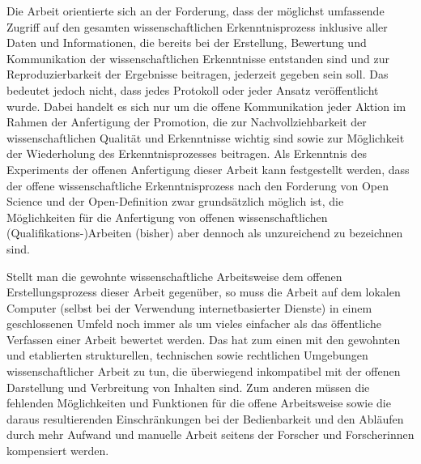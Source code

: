 Die Arbeit orientierte sich an der Forderung, dass der möglichst umfassende Zugriff auf den gesamten wissenschaftlichen Erkenntnisprozess inklusive aller Daten und Informationen, die bereits bei der Erstellung, Bewertung und Kommunikation der wissenschaftlichen Erkenntnisse entstanden sind und zur Reproduzierbarkeit der Ergebnisse beitragen, jederzeit gegeben sein soll. Das bedeutet jedoch nicht, dass jedes Protokoll oder jeder Ansatz veröffentlicht wurde. Dabei handelt es sich nur um die offene Kommunikation jeder Aktion im Rahmen der Anfertigung der Promotion, die zur Nachvollziehbarkeit der wissenschaftlichen Qualität und Erkenntnisse wichtig sind sowie zur Möglichkeit der Wiederholung des Erkenntnisprozesses beitragen. Als Erkenntnis des Experiments der offenen Anfertigung dieser Arbeit kann festgestellt werden, dass der offene wissenschaftliche Erkenntnisprozess nach den Forderung von Open Science und der Open-Definition zwar grundsätzlich möglich ist, die Möglichkeiten für die Anfertigung von offenen wissenschaftlichen (Qualifikations-)Arbeiten (bisher) aber dennoch als unzureichend zu bezeichnen sind.

Stellt man die gewohnte wissenschaftliche Arbeitsweise dem offenen Erstellungsprozess dieser Arbeit gegenüber, so muss die Arbeit auf dem lokalen Computer (selbst bei der Verwendung internetbasierter Dienste) in einem geschlossenen Umfeld noch immer als um vieles einfacher als das öffentliche Verfassen einer Arbeit bewertet werden. Das hat zum einen mit den gewohnten und etablierten strukturellen, technischen sowie rechtlichen Umgebungen wissenschaftlicher Arbeit zu tun, die überwiegend inkompatibel mit der offenen Darstellung und Verbreitung von Inhalten sind. Zum anderen müssen die fehlenden Möglichkeiten und Funktionen für die offene Arbeitsweise sowie die daraus resultierenden Einschränkungen bei der Bedienbarkeit und den Abläufen durch mehr Aufwand und manuelle Arbeit seitens der Forscher und Forscherinnen kompensiert werden.

